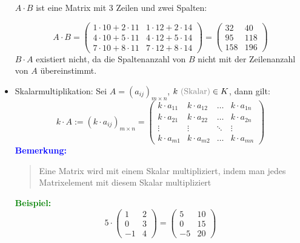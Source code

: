 \documentclass{article}
\newcommand{\gray}[1]{\textcolor{gray}{#1}}
\newcommand{\blue}[1]{\textcolor{blue}{#1}}
\newcommand{\green}[1]{\textcolor{green}{#1}}
\newcommand{\ex}{\green{\textbf{Beispiel: }}}
\newcommand{\an}[1]{\blue{\textbf{Bemerkung: }}\begin{quote}#1\end{quote}}
\begin{document}
\begin{itemize}
    $A \cdot B$ ist eine Matrix mit 3 Zeilen und zwei Spalten:

    \begin{equation*}
        A \cdot B = \begin{pmatrix}
            1 \cdot 10 + 2 \cdot 11 & 1 \cdot 12 + 2 \cdot 14\\
            4 \cdot 10 + 5 \cdot 11 & 4 \cdot 12 + 5 \cdot 14\\
            7 \cdot 10 + 8 \cdot 11 & 7 \cdot 12 + 8 \cdot 14
        \end{pmatrix}
        = \begin{pmatrix}
            32 & 40\\
            95 & 118\\
            158 & 196
        \end{pmatrix}
    \end{equation*}
    $B \cdot A$ existiert nicht, da die Spaltenanzahl von $B$ nicht mit der Zeilenanzahl von $A$ übereinstimmt.

    \newpage

    \item Skalarmultiplikation: Sei $A = (a_{ij})_{m \times n}$, $k \text{ \gray{(Skalar)}} \in K$, dann gilt:
    \begin{equation*}
        k \cdot A := (k \cdot a_{ij})_{m \times n} = \begin{pmatrix}
            k \cdot a_{11} & k \cdot a_{12} & \dots & k \cdot a_{1n}\\
            k \cdot a_{21} & k \cdot a_{22} & \dots & k \cdot a_{2n}\\
            \vdots & \vdots & \ddots & \vdots\\
            k \cdot a_{m1} & k \cdot a_{m2} & \dots & k \cdot a_{mn}
        \end{pmatrix}     
    \end{equation*}
    \an{Eine Matrix wird mit einem Skalar multipliziert, indem man jedes Matrixelement mit diesem Skalar multipliziert}
    \ex \begin{equation*}
        5 \cdot \begin{pmatrix}
            1 & 2\\
            0 & 3\\
            -1 & 4
        \end{pmatrix}
        = \begin{pmatrix}
            5 & 10\\
            0 & 15\\
            -5 & 20
        \end{pmatrix}
    \end{equation*}


\end{itemize}
\end{document}
